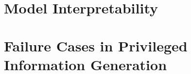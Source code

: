 
\section{Model Interpretability}
\label{sec:5_interpretability}


\section{Failure Cases in Privileged Information Generation}
\label{sec:5_fail_cases_priv_info_gen}


